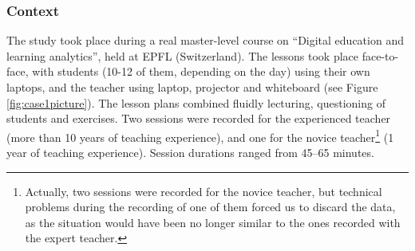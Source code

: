 \documentclass[10pt,journal,compsoc]{IEEEtran}
\begin{document}

\subsubsection{Context}

The study took place during a real master-level course on ``Digital education and learning analytics'', held at EPFL (Switzerland). The lessons took place face-to-face, with students (10-12 of them, depending on the day) using their own laptops, and the teacher using laptop, projector and whiteboard (see Figure \ref{fig:case1picture}). The lesson plans combined fluidly lecturing, questioning of students and exercises. Two sessions were recorded for the experienced teacher (more than 10 years of teaching experience), and one for the novice teacher\footnote{Actually, two sessions were recorded for the novice teacher, but technical problems during the recording of one of them forced us to discard the data, as the situation would have been no longer similar to the ones recorded with the expert teacher.} (1 year of teaching experience). Session durations ranged from 45--65 minutes.


\end{document}
